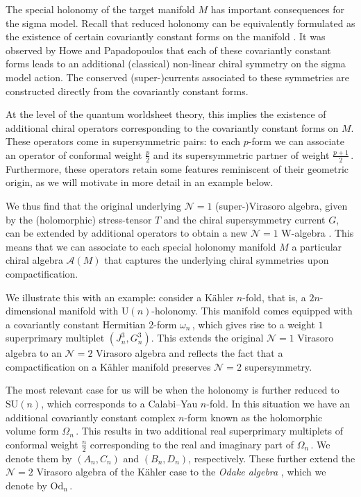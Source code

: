 \documentclass{pspum-l}
\theoremstyle{definition}
\theoremstyle{remark}
\numberwithin{equation}{section}
\begin{document}
The special holonomy of the target manifold $M$ has important consequences for the sigma model. Recall that reduced holonomy can be equivalently formulated as the existence of certain covariantly constant forms on the manifold \cite{Joyce:2007}. It was observed by Howe and Papadopoulos \cite{Howe:1991vs, Howe:1991im,  Howe:1991ic} that each of these covariantly constant forms leads to an additional (classical) non-linear chiral symmetry on the sigma model action. The conserved (super-)currents associated to these symmetries are constructed directly from the covariantly constant forms.

At the level of the quantum worldsheet theory, this implies the existence of additional chiral operators corresponding to the covariantly constant forms on $M$. These operators come in supersymmetric pairs: to each $p$-form we can associate an operator of conformal weight $\frac{p}{2}$ and its supersymmetric partner of weight $\frac{p+1}{2}\,$. Furthermore, these operators retain some features reminiscent of their geometric origin, as we will motivate in more detail in an example below. %


We thus find that the original underlying $\mathcal{N}=1$ (super-)Virasoro algebra, given by the (holomorphic) stress-tensor $T$ and the chiral supersymmetry current $G$, can be extended by additional operators to obtain a new $\mathcal{N}=1$ W-algebra \cite{Odake:1988bh, Shatashvili:1994zw, Figueroa-OFarrill:1990tqt, Figueroa-OFarrill:1990mzn, Blumenhagen:1991nm, Figueroa-OFarrill:1996tnk}. This means that we can associate to each special holonomy manifold $M$ a particular chiral algebra $\mathcal{A}(M)$ that captures the underlying chiral symmetries upon compactification.

We illustrate this with an example: consider a K\"ahler $n$-fold, that is, a $2n$-dimensional manifold with $\text{U}(n)$-holonomy. This manifold comes equipped with a covariantly constant Hermitian 2-form $\omega_n\,$, which gives rise to a weight $1$ superprimary multiplet $(J^3_n,G^3_n)$. This extends the original $\mathcal{N}=1$ Virasoro algebra to an $\mathcal{N}=2$ Virasoro algebra and reflects the fact that a compactification on a K\"ahler manifold preserves $\mathcal{N}=2$ supersymmetry.

The most relevant case for us will be when the holonomy is further reduced to $\text{SU}(n)$, which corresponds to a Calabi--Yau $n$-fold. In this situation we have an additional covariantly constant complex $n$-form known as the holomorphic volume form $\Omega_n\,$. This results in two additional real superprimary multiplets of conformal weight $\frac{n}{2}$ corresponding to the real and imaginary part of $\Omega_n\,$. We denote them by $(A_n,C_n)$
and $(B_n,D_n)$, respectively. These further extend the $\mathcal{N}=2$ Virasoro algebra of the K\"ahler case to the \emph{Odake algebra} \cite{Odake:1988bh}, which we denote by $\text{Od}_n \,$.
 
\end{document}
